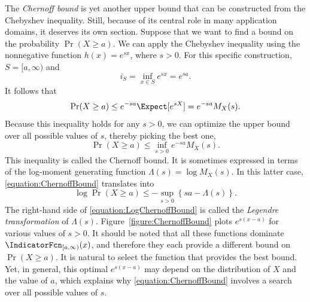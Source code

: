 The \emph{Chernoff bound} is yet another upper bound that can be constructed from the Chebyshev inequality. 
Still, because of its central role in many application domains, it deserves its own section.
Suppose that we want to find a bound on the probability $\Pr (X \geq a)$.
We can apply the Chebyshev inequality using the nonnegative function $h(x) = e^{sx}$, where $s > 0$.
For this specific construction, $S = [a, \infty)$ and
\begin{equation*}
i_S = \inf_{x \in S} e^{sx} = e^{sa} .
\end{equation*}
It follows that
\begin{equation*}
\Pr (X \geq a) \leq e^{-sa} \Expect[ e^{sX} ] = e^{-sa} M_X(s) .
\end{equation*}
Because this inequality holds for any $s > 0$, we can optimize the upper bound over all possible values of $s$, thereby picking the best one,
\begin{equation} \label{equation:ChernoffBound}
\Pr (X \geq a) \leq \inf_{s > 0} e^{-sa} M_X(s) .
\end{equation}
This inequality is called the Chernoff bound.
It is sometimes expressed in terms of the log-moment generating function $\Lambda (s) = \log M_X (s)$.
In this latter case, \eqref{equation:ChernoffBound} translates into
\begin{equation} \label{equation:LogChernoffBound}
\log \Pr (X \geq a) \leq - \sup_{s>0} \left\{ sa - \Lambda (s) \right\} .
\end{equation}
The right-hand side of \eqref{equation:LogChernoffBound} is called the \emph{Legendre transformation} of $\Lambda (s)$. 
Figure~\ref{figure:ChernoffBound} plots $e^{s(x-a)}$ for various values of $s > 0$.
It should be noted that all these functions dominate $\IndicatorFcn_{[a, \infty)}(x)$, and therefore they each provide a different bound on $\Pr (X \geq a)$.
It is natural to select the function that provides the best bound.
Yet, in general, this optimal $e^{s(x-a)}$ may depend on the distribution of $X$ and the value of $a$, which explains why \eqref{equation:ChernoffBound} involves a search over all possible values of $s$.

